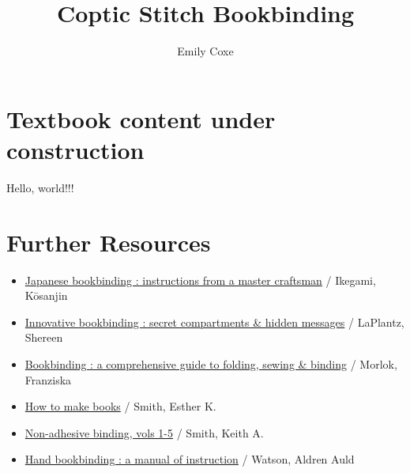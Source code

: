 \documentclass[
  openany]{book}
\title{Coptic Stitch Bookbinding}
\author{Emily Coxe}
\date{}
\providecommand{\tightlist}{%
  \setlength{\itemsep}{0pt}\setlength{\parskip}{0pt}}
\begin{document}
\maketitle

{
\setcounter{tocdepth}{1}
\tableofcontents
}
\chapter{Textbook content under construction}\label{textbook-content-under-construction}

Hello, world!!!

\chapter{Further Resources}\label{further-resources}

\begin{itemize}
\tightlist
\item
  \href{https://search.worldcat.org/title/11866980}{Japanese bookbinding : instructions from a master craftsman} / Ikegami, Kōsanjin
\item
  \href{https://search.worldcat.org/title/37809087}{Innovative bookbinding : secret compartments \& hidden messages} / LaPlantz, Shereen
\item
  \href{https://search.worldcat.org/title/1047524099}{Bookbinding : a comprehensive guide to folding, sewing \& binding} / Morlok, Franziska
\item
  \href{https://search.worldcat.org/title/123349651}{How to make books} / Smith, Esther K.
\item
  \href{https://search.worldcat.org/title/43303159}{Non-adhesive binding, vols 1-5} / Smith, Keith A.
\item
  \href{https://search.worldcat.org/title/964990}{Hand bookbinding : a manual of instruction} / Watson, Aldren Auld
\end{itemize}
\end{document}

